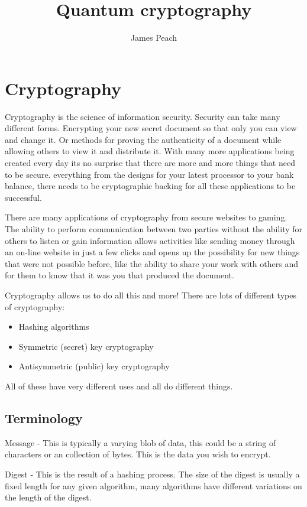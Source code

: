\documentclass[12pt]{article}
\begin{document}
\author{James Peach}
\title{Quantum cryptography}

\maketitle

\section{Cryptography}
Cryptography is the science of information security. Security can take
many different forms. Encrypting your new secret document so that only
you can view and change it. Or methods for proving the authenticity of 
a document while allowing others to view it and distribute it. With many
more applications being created every day its no surprise that there
are more and more things that need to be secure. everything from the designs for
your latest processor to your bank balance, there needs to be cryptographic
backing for all these applications to be successful.


There are many applications of cryptography from secure
websites to gaming. The ability to perform communication between two parties
without the ability for others to listen or gain information allows activities like sending money
through an on-line website in just a few clicks and opens up the possibility
for new things that were not possible before, like the ability to share
your work with others and for them to know that it was you that produced
the document.

Cryptography allows us to do all this and more! There are lots of
different types of cryptography:
\begin{itemize}
  \item Hashing algorithms
  \item Symmetric (secret) key cryptography
  \item Antisymmetric (public) key cryptography
\end{itemize}
All of these have very different uses and all do different things.

\subsection{Terminology}
Message - This is typically a varying blob of data, this could be a string of characters or an  collection of bytes. This is the data you wish to encrypt. 

Digest - This is the result of a hashing process. The size of the digest is usually a fixed length for any given algorithm, many algorithms have different variations on the length of the digest.
\end{document}

